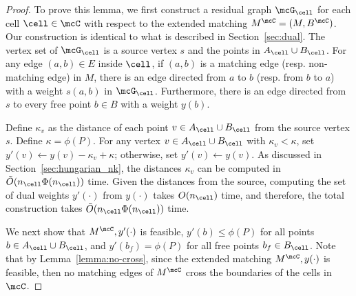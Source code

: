 \begin{proof}
    To prove this lemma, we first construct a residual graph $\mcG_\cell$ for each cell $\cell\in\mcC$ with respect to the extended matching $M^\mcC=(M, B^{\mcC})$. Our construction is identical to what is described in Section~\ref{sec:dual}. The vertex set of $\mcG_\cell$ is a source vertex $s$ and the points in $A_\cell\cup B_\cell$. For any edge $(a,b)\in E$ inside $\cell$, if $(a,b)$ is a matching edge (resp. non-matching edge) in $M$, there is an edge directed from $a$ to $b$ (resp. from $b$ to $a$) with a weight $s(a,b)$ in $\mcG_\cell$. Furthermore, there is an edge directed from $s$ to every free point $b\in B$ with a weight $y(b)$. 

    Define $\kappa_v$ as the distance of each point $v\in A_\cell\cup B_\cell$ from the source vertex $s$. Define $\kappa=\phi(P)$. For any vertex $v\in A_\cell\cup B_\cell$ with $\kappa_v<\kappa$, set $y'(v)\leftarrow y(v)-\kappa_v+\kappa$; otherwise, set $y'(v)\leftarrow y(v)$. As discussed in Section~\ref{sec:hungarian_nk}, the distances $\kappa_v$ can be computed in $\tilde{O}(n_\cell\Phi(n_\cell))$ time. Given the distances from the source, computing the set of dual weights $y'(\cdot)$ from $y(\cdot)$ takes $O(n_\cell)$ time, and therefore, the total construction takes $\tilde{O}(n_\cell\Phi(n_\cell))$ time. 
    
    We next show that $M^\mcC, y'(\cdot)$ is feasible, $y'(b)\le \phi(P)$ for all points $b\in A_\cell\cup B_\cell$, and $y'(b_f)=\phi(P)$ for all free points $b_f\in B_\cell$. Note that by Lemma~\ref{lemma:no-cross}, since the extended matching $M^\mcC, y(\cdot)$ is feasible, then no matching edges of $M^\mcC$ cross the boundaries of the cells in $\mcC$.


\end{proof}
